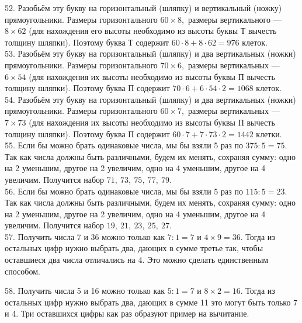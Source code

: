 52. Разобьём эту букву на горизонтальный (шляпку) и вертикальный (ножку) прямоугольники. Размеры горизонтального $60\times8,$ размеры вертикального --- $8\times62$ (для нахождения его высоты необходимо из высоты буквы Т вычесть толщину шляпки). Поэтому буква Т содержит $60\cdot8+8\cdot62=976$ клеток.\\
53. Разобьём эту букву на горизонтальный (шляпку) и два вертикальных (ножки) прямоугольники. Размеры горизонтального $70\times6,$ размеры вертикальных --- $6\times54$ (для нахождения их высоты необходимо из высоты буквы П вычесть толщину шляпки). Поэтому буква П содержит $70\cdot6+6\cdot54\cdot2=1068$ клеток.\\
54. Разобьём эту букву на горизонтальный (шляпку) и два вертикальных (ножки) прямоугольники. Размеры горизонтального $60\times7,$ размеры вертикальных --- $7\times73$ (для нахождения их высоты необходимо из высоты буквы П вычесть толщину шляпки). Поэтому буква П содержит $60\cdot7+7\cdot73\cdot2=1442$ клетки.\\
55. Если бы можно брать одинаковые числа, мы бы взяли 5 раз по $375:5=75.$ Так как числа должны быть различными, будем их менять, сохраняя сумму: одно на 2 уменьшим, другое на 2 увеличим, одно на 4 уменьшим, другое на 4 увеличим. Получится набор $71,\ 73,\ 75,\ 77,\ 79.$\\
56. Если бы можно брать одинаковые числа, мы бы взяли 5 раз по $115:5=23.$ Так как числа должны быть различными, будем их менять, сохраняя сумму: одно на 2 уменьшим, другое на 2 увеличим, одно на 4 уменьшим, другое на 4 увеличим. Получится набор $19,\ 21,\ 23,\ 25,\ 27.$\\
57. Получить числа 7 и 36 можно только как $7:1=7$ и $4\times9=36.$ Тогда из остальных цифр нужно выбрать два, дающих в сумме третье так, чтобы оставшиеся два числа отличались на 4. Это можно сделать единственным способом.
\begin{center}
\begin{figure}[ht!]
\end{figure}
\end{center}
58. Получить числа 5 и 16 можно только как $5:1=7$ и $8\times2=16.$ Тогда из остальных цифр нужно выбрать два, дающих в сумме 11 это могут быть только 7 и 4. Три оставшихся цифры как раз образуют пример на вычитание.
\begin{center}
\begin{figure}[ht!]
\end{figure}
\end{center}
